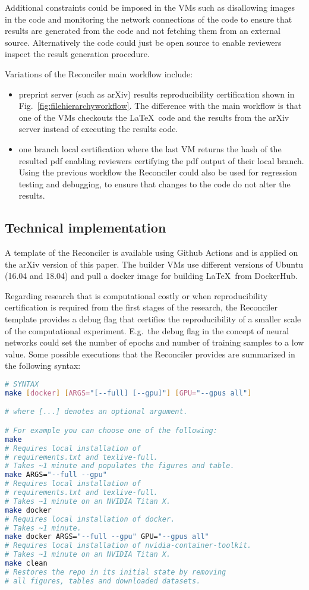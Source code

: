 \documentclass[journal]{IEEEtran}
\begin{document}
Additional constraints could be imposed in the VMs such as disallowing images in the code and monitoring the network connections of the code to ensure that results are generated from the code and not fetching them from an external source.
Alternatively the code could just be open source to enable reviewers inspect the result generation procedure.

Variations of the Reconciler main workflow include:
\begin{itemize}
	\item preprint server (such as arXiv) results reproducibility certification shown in Fig.~\ref{fig:filehierarchyworkflow}.
		The difference with the main workflow is that one of the VMs checkouts the \LaTeX\ code and the results from the arXiv server instead of executing the results code.
	\item one branch local certification where the last VM returns the hash of the resulted pdf enabling reviewers certifying the pdf output of their local branch.
		Using the previous workflow the Reconciler could also be used for regression testing and debugging, to ensure that changes to the code do not alter the results.
\end{itemize}

\subsection{Technical implementation}
A template of the Reconciler is available using Github Actions and is applied on the arXiv version of this paper.
The builder VMs use different versions of Ubuntu (16.04 and 18.04) and pull a docker image for building \LaTeX\ from DockerHub.

Regarding research that is computational costly or when reproducibility certification is required from the first stages of the research, the Reconciler template provides a debug flag that certifies the reproducibility of a smaller scale of the computational experiment.
E.g.\ the debug flag in the concept of neural networks could set the number of epochs and number of training samples to a low value.
Some possible executions that the Reconciler provides are summarized in the following syntax:
\begin{lstlisting}[language=Bash, style=lststyle, caption={Makefile call syntax from the shell.}, captionpos=b]
# SYNTAX
make [docker] [ARGS="[--full] [--gpu]"] [GPU="--gpus all"]

# where [...] denotes an optional argument.

# For example you can choose one of the following:
make
# Requires local installation of
# requirements.txt and texlive-full.
# Takes ~1 minute and populates the figures and table.
make ARGS="--full --gpu"
# Requires local installation of
# requirements.txt and texlive-full.
# Takes ~1 minute on an NVIDIA Titan X.
make docker
# Requires local installation of docker.
# Takes ~1 minute.
make docker ARGS="--full --gpu" GPU="--gpus all"
# Requires local installation of nvidia-container-toolkit.
# Takes ~1 minute on an NVIDIA Titan X.
make clean
# Restores the repo in its initial state by removing
# all figures, tables and downloaded datasets.
\end{lstlisting}
\end{document}
